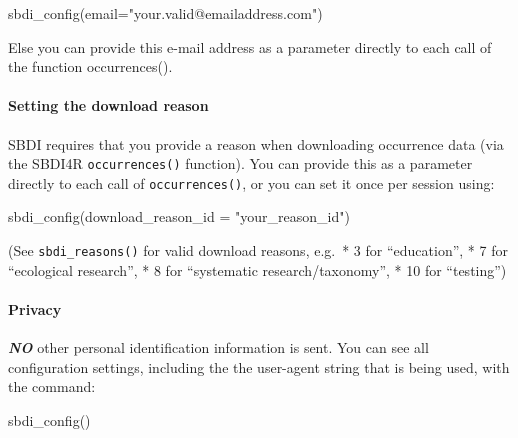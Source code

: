\documentclass[
  10pt,
]{article}
\newenvironment{Shaded}{\begin{snugshade}}{\end{snugshade}}
\newcommand{\AttributeTok}[1]{\textcolor[rgb]{0.77,0.63,0.00}{#1}}
\newcommand{\FunctionTok}[1]{\textcolor[rgb]{0.00,0.00,0.00}{#1}}
\newcommand{\NormalTok}[1]{#1}
\newcommand{\StringTok}[1]{\textcolor[rgb]{0.31,0.60,0.02}{#1}}
\begin{document}
\begin{Shaded}
\begin{Highlighting}[]
\FunctionTok{sbdi\_config}\NormalTok{(}\AttributeTok{email=}\StringTok{"your.valid@emailaddress.com"}\NormalTok{)}
\end{Highlighting}
\end{Shaded}

Else you can provide this e-mail address as a parameter directly to each call of the function occurrences().

\hypertarget{setting-the-download-reason}{%
\paragraph*{Setting the download reason}\label{setting-the-download-reason}}

SBDI requires that you provide a reason when downloading occurrence data (via the SBDI4R \texttt{occurrences()} function). You can provide this as a parameter directly to each call of \texttt{occurrences()}, or you can set it once per session using:

\begin{Shaded}
\begin{Highlighting}[]
\FunctionTok{sbdi\_config}\NormalTok{(}\AttributeTok{download\_reason\_id =} \StringTok{"your\_reason\_id"}\NormalTok{)}
\end{Highlighting}
\end{Shaded}

(See \texttt{sbdi\_reasons()} for valid download reasons, e.g.~* 3 for ``education'', * 7 for ``ecological research'', * 8 for ``systematic research/taxonomy'', * 10 for ``testing'')

\hypertarget{privacy}{%
\paragraph{Privacy}\label{privacy}}

\textbf{\emph{NO}} other personal identification information is sent. You can see all configuration settings, including the the user-agent string that is being used, with the command:

\begin{Shaded}
\begin{Highlighting}[]
\FunctionTok{sbdi\_config}\NormalTok{()}
\end{Highlighting}
\end{Shaded}
\end{document}
